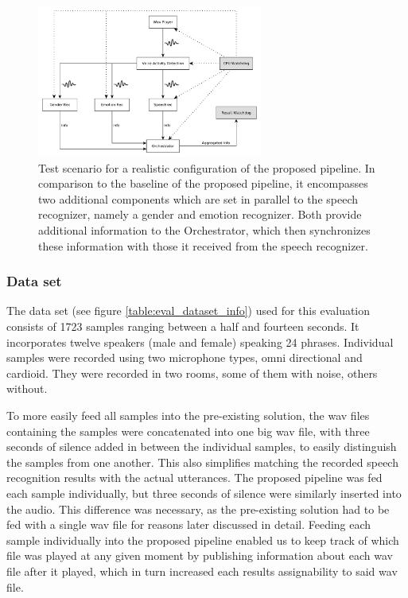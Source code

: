 \begin{figure}[]
	\centering
	\includegraphics[width=0.66\textwidth]{diagrams/eval_pipeline_5.pdf}
	\caption{Test scenario for a realistic configuration of the proposed pipeline.
		In comparison to the baseline of the proposed pipeline, it encompasses two additional components which are set in parallel to the speech recognizer, namely a gender and emotion recognizer.
		Both provide additional information to the Orchestrator, which then synchronizes these information with those it received from the speech recognizer.}
	\label{pic:eval_p5_diag}
\end{figure}

\subsubsection{Data set}
\label{eval:dataset:dataset}

The data set (see figure \ref{table:eval_dataset_info}) used for this evaluation consists of 1723 samples ranging between a half and fourteen seconds.
It incorporates twelve speakers (male and female) speaking 24 phrases. 
Individual samples were recorded using two microphone types, omni directional and cardioid.
They were recorded in two rooms, some of them with noise, others without.

To more easily feed all samples into the pre-existing solution, the wav files containing the samples were concatenated into one big wav file, with three seconds of silence added in between the individual samples, to easily distinguish the samples from one another.
This also simplifies matching the recorded speech recognition results with the actual utterances.
The proposed pipeline was fed each sample individually, but three seconds of silence were similarly inserted into the audio.
This difference was necessary, as the pre-existing solution had to be fed with a single wav file for reasons later discussed in detail.
Feeding each sample individually into the proposed pipeline enabled us to keep track of which file was played at any given moment by publishing information about each wav file after it played, which in turn increased each results assignability to said wav file.

